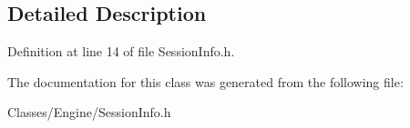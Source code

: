 \subsection{Detailed Description}


Definition at line 14 of file SessionInfo.h.



The documentation for this class was generated from the following file:\begin{DoxyCompactItemize}
\item 
Classes/Engine/SessionInfo.h\end{DoxyCompactItemize}

